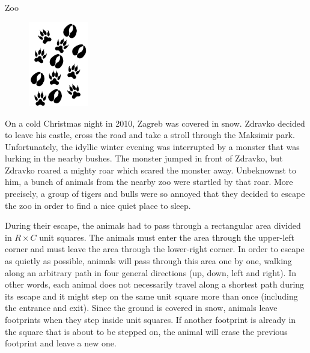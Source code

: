 \begin{statement}[
  problempoints=110,
  timelimit=2 seconds,
  memorylimit=512 MiB,
]{Zoo}

\setlength\intextsep{-0.1cm}
\begin{figure}
\centering
\includegraphics[width=0.23\textwidth]{img/tragovi.png}
\end{figure}


On a cold Christmas night in 2010, Zagreb was covered in snow.
Zdravko decided to leave his castle, cross the road and take a stroll through
the Maksimir park. Unfortunately, the idyllic winter evening was interrupted by
a monster that was lurking in the nearby bushes. The monster jumped in front of
Zdravko, but Zdravko roared a mighty roar which scared the monster away.
Unbeknownst to him, a bunch of animals from the nearby zoo were startled by
that roar. More precisely, a group of tigers and bulls were so annoyed that they
decided to escape the zoo in order to find a nice quiet place to sleep.

During their escape, the animals had to pass through a rectangular area divided
in $R \times C$ unit squares. The animals must enter the area through the
upper-left corner and must leave the area through the lower-right corner. In
order to escape as quietly as possible, animals will pass through this area
one by one, walking along an arbitrary path in four general directions (up,
down, left and right). In other words, each animal does
not necessarily travel along a shortest path during its escape
and it might step on the same unit square more than once (including the entrance
and exit). Since the ground is covered in snow, animals leave footprints when
they step inside unit squares. If another footprint is already in the square
that is about to be stepped on, the animal will erase the previous footprint and
leave a new one.


\end{statement}
